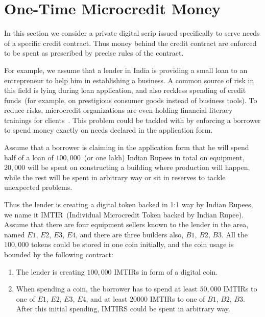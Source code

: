 \documentclass[]{llncs}   %
\begin{document}


\section{One-Time Microcredit Money}
\label{sec-microcredit}

 In this section we consider a private digital scrip issued specifically to serve needs of a specific credit contract. Thus money behind the credit contract are enforced to be spent as prescribed by precise rules of the contract.

 For example, we assume that a lender in India is providing a small loan to an entrepreneur to help him in establishing a business.
 A common source of risk in this field is lying during loan application, and also reckless spending of credit funds~(for example, on prestigious consumer goods instead of business tools). To reduce risks, microcredit
 organizations are even holding financial literacy trainings for clients~\cite{finliteracy}. This problem could be tackled with by  enforcing a borrower to spend money exactly on needs declared in the application form.  

 Assume that a borrower is claiming in the application form that he will spend half of a loan of $100,000$~(or one lakh) 
 Indian Rupees in total on equipment, $20,000$ will be spent on constructing a building where production will happen, while the rest will be spent in arbitrary way or sit in reserves to tackle unexpected problems.

 Thus the lender is creating a digital token backed in 1:1 way by Indian Rupees, we name it IMTIR~(Individual Microcredit Token backed by Indian Rupee). Assume that there are four equipment sellers known to the lender in the area, named $E1$, $E2$, $E3$, $E4$, and
 there are three builders also, $B1$, $B2$, $B3$. All the $100,000$ tokens could be stored in one coin initially, and the coin usage is bounded by the following contract:

 \begin{enumerate}
    \item{} The lender is creating $100,000$ IMTIRs in form of a digital coin.
    \item{} When spending a coin, the borrower has to spend at least $50,000$ IMTIRs to one of $E1$, $E2$, $E3$, $E4$, and
    at least $20000$ IMTIRs to one of $B1$, $B2$, $B3$. After this initial spending, IMTIRS could be spent in arbitrary way.
\end{enumerate}
\end{document}
